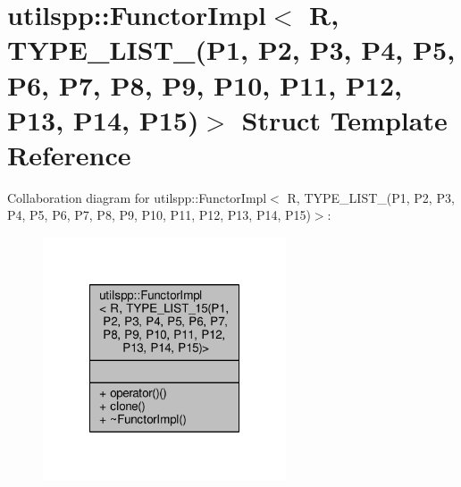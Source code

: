 \hypertarget{structutilspp_1_1FunctorImpl_3_01R_00_01TYPE__LIST__15_07P1_00_01P2_00_01P3_00_01P4_00_01P5_00_03f6bfb72f2977866a35a5dbc6e440ab4}{\section{utilspp\-:\-:Functor\-Impl$<$ R, T\-Y\-P\-E\-\_\-\-L\-I\-S\-T\-\_(P1, P2, P3, P4, P5, P6, P7, P8, P9, P10, P11, P12, P13, P14, P15)$>$ Struct Template Reference}
\label{structutilspp_1_1FunctorImpl_3_01R_00_01TYPE__LIST__15_07P1_00_01P2_00_01P3_00_01P4_00_01P5_00_03f6bfb72f2977866a35a5dbc6e440ab4}
}


Collaboration diagram for utilspp\-:\-:Functor\-Impl$<$ R, T\-Y\-P\-E\-\_\-\-L\-I\-S\-T\-\_(P1, P2, P3, P4, P5, P6, P7, P8, P9, P10, P11, P12, P13, P14, P15)$>$\-:
\nopagebreak
\begin{figure}[H]
\begin{center}
\leavevmode
\includegraphics[width=204pt]{structutilspp_1_1FunctorImpl_3_01R_00_01TYPE__LIST__15_07P1_00_01P2_00_01P3_00_01P4_00_01P5_00_08a89af694afbd983ff661781d76f97f6}
\end{center}
\end{figure}
